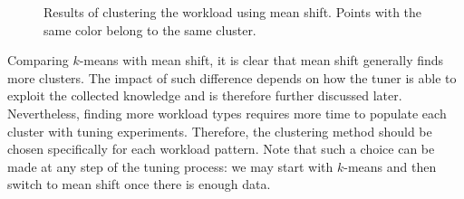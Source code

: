 \documentclass[a4paper, 12pt]{article} %
\begin{document}
	\begin{figure}\centering
		 \hfill
		
		\caption{Results of clustering the workload using mean shift. Points with the same color belong to the same cluster.}
		\label{fig:results_clustering_meanshift}
	\end{figure}
	
	Comparing $k$-means with mean shift, it is clear that mean shift generally finds more clusters. The impact of such difference depends on how the tuner is able to exploit the collected knowledge and is therefore further discussed later.  Nevertheless, finding more workload types requires more time to populate each cluster with tuning experiments. Therefore, the clustering method should be chosen specifically for each workload pattern. Note that such a choice can be made at any step of the tuning process: we may start with $k$-means and then switch to mean shift once there is enough data.
	
\end{document}
